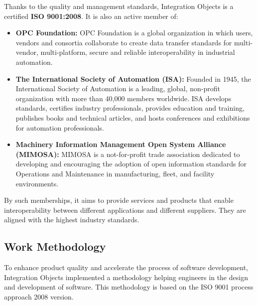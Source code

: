 Thanks to the quality and management standards, Integration Objects is a certified \textbf{ISO 9001:2008}. It is also an active member of:
\begin{itemize}
\item \textbf{OPC Foundation:} OPC Foundation is a global organization in which users, vendors and consortia collaborate to create data transfer standards for multi-vendor, multi-platform, secure and reliable interoperability in industrial automation.
\item \textbf{The International Society of Automation (ISA):} Founded in 1945, the International Society of Automation is a leading, global, non-profit organization with more than 40,000 members worldwide. ISA develops standards, certifies industry professionals, provides education and training, publishes books and technical articles, and hosts conferences and exhibitions for automation professionals.
\item \textbf{Machinery Information Management Open System Alliance (MIMOSA):} MIMOSA is a not-for-profit trade association dedicated to developing and encouraging the adoption of open information standards for Operations and Maintenance in manufacturing, fleet, and facility environments.\\
\end{itemize}

By such memberships, it aims to provide services and products that enable interoperability between different applications and different suppliers. They are aligned with the highest industry standards.

\subsection{Work Methodology}
To enhance product quality and accelerate the process of software development, Integration Objects implemented a methodology helping engineers in the design and development of software. This methodology is based on the ISO 9001 process approach 2008 version.\\

